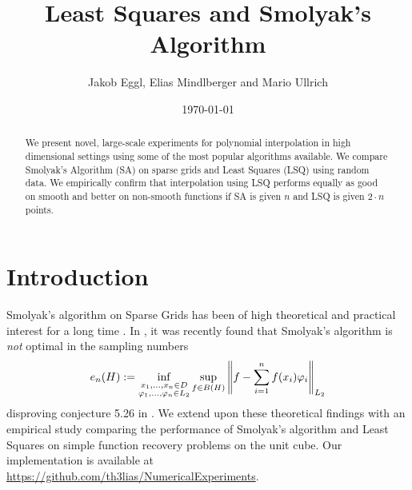\documentclass[12pt, oneside]{amsart}
\theoremstyle{definition}
\theoremstyle{remark}
\numberwithin{equation}{section}
\begin{document}
\title{Least Squares and Smolyak's Algorithm}


\author{Jakob Eggl, Elias Mindlberger and Mario Ullrich}
\date{\today}

%
%



\begin{abstract}
We present novel, large-scale experiments for polynomial interpolation in high 
dimensional settings using some of the most popular algorithms available. We 
compare Smolyak's Algorithm (SA) on sparse grids and Least Squares (LSQ) using 
random data. We empirically confirm that interpolation using LSQ performs 
equally as good on smooth and better on non-smooth functions if SA is given 
\(n\) and LSQ is given \(2 \cdot n\) points.
\end{abstract}

\maketitle


\section{Introduction}

Smolyak's algorithm on Sparse Grids has been of high theoretical and practical 
interest for a long time \cite{BarthelmannHighDim_2000,smolyak1963,Coleman_SmoylakGithub_2013,JuddSmolyak_2014}. In \cite{Krieg_2020}, it was recently found that Smolyak's algorithm is \emph{not} optimal in the sampling numbers
\[
    e_n(H) \defn \inf_{\substack{x_1, \dots, x_n \in D \\ \phi_1, \dots, \phi_n 
    \in L_2}} \sup_{f \in B(H)} \norm[L_2]{f - \sum_{i=1}^n f(x_i) \phi_i}
\]
disproving conjecture 5.26 in \cite{Dung_Temlyakov_Ullrich_2018}. We extend upon these theoretical findings with an empirical study comparing the performance of Smolyak's algorithm and Least Squares on simple function recovery problems on the unit cube. Our implementation is available at \url{https://github.com/th3lias/NumericalExperiments}.
\end{document}
